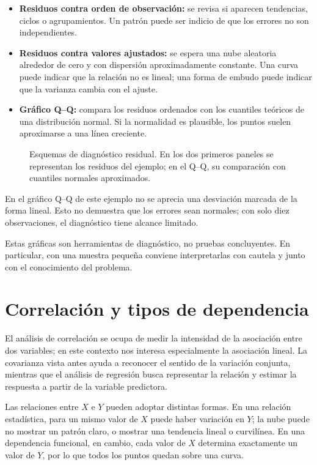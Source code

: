 \begin{itemize}
    \item \textbf{Residuos contra orden de observación:} se revisa si aparecen tendencias, ciclos o agrupamientos. Un patrón puede ser indicio de que los errores no son independientes.
    \item \textbf{Residuos contra valores ajustados:} se espera una nube aleatoria alrededor de cero y con dispersión aproximadamente constante. Una curva puede indicar que la relación no es lineal; una forma de embudo puede indicar que la varianza cambia con el ajuste.
    \item \textbf{Gráfico Q--Q:} compara los residuos ordenados con los cuantiles teóricos de una distribución normal. Si la normalidad es plausible, los puntos suelen aproximarse a una línea creciente.
\end{itemize}

\begin{figure}[H]
\centering

\caption{Esquemas de diagnóstico residual. En los dos primeros paneles se representan los residuos del ejemplo; en el Q--Q, su comparación con cuantiles normales aproximados.}
\label{fig:diagnostico-residuos}
\end{figure}

En el gráfico Q--Q de este ejemplo no se aprecia una desviación marcada de la forma lineal. Esto no demuestra que los errores sean normales; con solo diez observaciones, el diagnóstico tiene alcance limitado.

Estas gráficas son herramientas de diagnóstico, no pruebas concluyentes. En particular, con una muestra pequeña conviene interpretarlas con cautela y junto con el conocimiento del problema.

\section{Correlación y tipos de dependencia}

El análisis de correlación se ocupa de medir la intensidad de la asociación entre dos variables; en este contexto nos interesa especialmente la asociación lineal. La covarianza vista antes ayuda a reconocer el sentido de la variación conjunta, mientras que el análisis de regresión busca representar la relación y estimar la respuesta a partir de la variable predictora.

Las relaciones entre $X$ e $Y$ pueden adoptar distintas formas. En una relación estadística, para un mismo valor de $X$ puede haber variación en $Y$; la nube puede no mostrar un patrón claro, o mostrar una tendencia lineal o curvilínea. En una dependencia funcional, en cambio, cada valor de $X$ determina exactamente un valor de $Y$, por lo que todos los puntos quedan sobre una curva.

